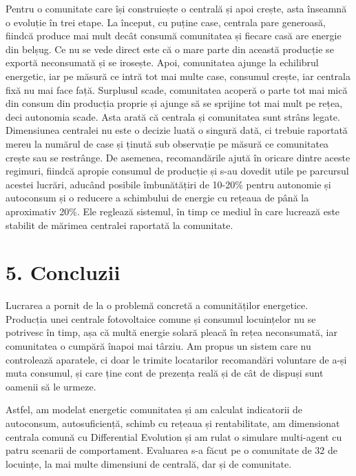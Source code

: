 \documentclass[12pt,a4paper]{report}
\begin{document}
Pentru o comunitate care își construiește o centrală și apoi crește, asta înseamnă o evoluție în trei etape. La început, cu puține case, centrala pare generoasă, fiindcă produce mai mult decât consumă comunitatea și fiecare casă are energie din belșug. Ce nu se vede direct este că o mare parte din această producție se exportă neconsumată și se irosește. Apoi, comunitatea ajunge la echilibrul energetic, iar pe măsură ce intră tot mai multe case, consumul crește, iar centrala fixă nu mai face față. Surplusul scade, comunitatea acoperă o parte tot mai mică din consum din producția proprie și ajunge să se sprijine tot mai mult pe rețea, deci autonomia scade. Asta arată că centrala și comunitatea sunt strâns legate. Dimensiunea centralei nu este o decizie luată o singură dată, ci trebuie raportată mereu la numărul de case și ținută sub observație pe măsură ce comunitatea crește sau se restrânge. De asemenea, recomandările ajută în oricare dintre aceste regimuri, fiindcă apropie consumul de producție și s-au dovedit utile pe parcursul acestei lucrări, aducând posibile îmbunătățiri de 10-20\% pentru autonomie și autoconsum și o reducere a schimbului de energie cu rețeaua de până la aproximativ 20\%. Ele reglează sistemul, în timp ce mediul în care lucrează este stabilit de mărimea centralei raportată la comunitate.

\clearpage

\chapter*{5. Concluzii}

Lucrarea a pornit de la o problemă concretă a comunităților energetice. Producția unei centrale fotovoltaice comune și consumul locuințelor nu se potrivesc în timp, așa că multă energie solară pleacă în rețea neconsumată, iar comunitatea o cumpără înapoi mai târziu. Am propus un sistem care nu controlează aparatele, ci doar le trimite locatarilor recomandări voluntare de a-și muta consumul, și care ține cont de prezența reală și de cât de dispuși sunt oamenii să le urmeze.

Astfel, am modelat energetic comunitatea și am calculat indicatorii de autoconsum, autosuficiență, schimb cu rețeaua și rentabilitate, am dimensionat centrala comună cu Differential Evolution și am rulat o simulare multi-agent cu patru scenarii de comportament. Evaluarea s-a făcut pe o comunitate de 32 de locuințe, la mai multe dimensiuni de centrală, dar și de comunitate.
\end{document}
